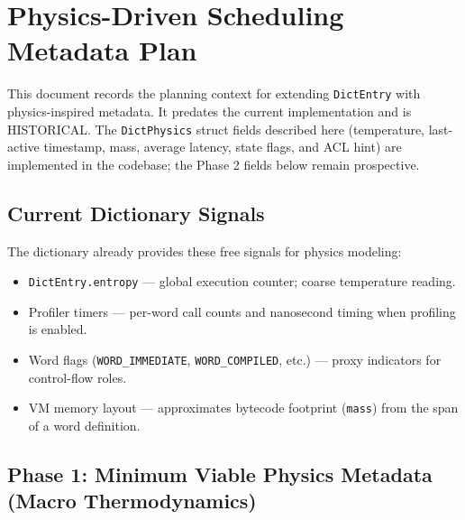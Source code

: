 
\section{Physics-Driven Scheduling Metadata Plan}

This document records the planning context for extending \texttt{DictEntry}
with physics-inspired metadata. It predates the current implementation and
is HISTORICAL. The \texttt{DictPhysics} struct fields described here
(temperature, last-active timestamp, mass, average latency, state flags,
and ACL hint) are implemented in the codebase; the Phase 2 fields below
remain prospective.

\subsection{Current Dictionary Signals}

The dictionary already provides these free signals for physics modeling:

\begin{itemize}
  \item \texttt{DictEntry.entropy} — global execution counter; coarse
        temperature reading.
  \item Profiler timers — per-word call counts and nanosecond timing when
        profiling is enabled.
  \item Word flags (\texttt{WORD\_IMMEDIATE}, \texttt{WORD\_COMPILED}, etc.)
        — proxy indicators for control-flow roles.
  \item VM memory layout — approximates bytecode footprint (\texttt{mass})
        from the span of a word definition.
\end{itemize}

\subsection{Phase 1: Minimum Viable Physics Metadata (Macro Thermodynamics)}

